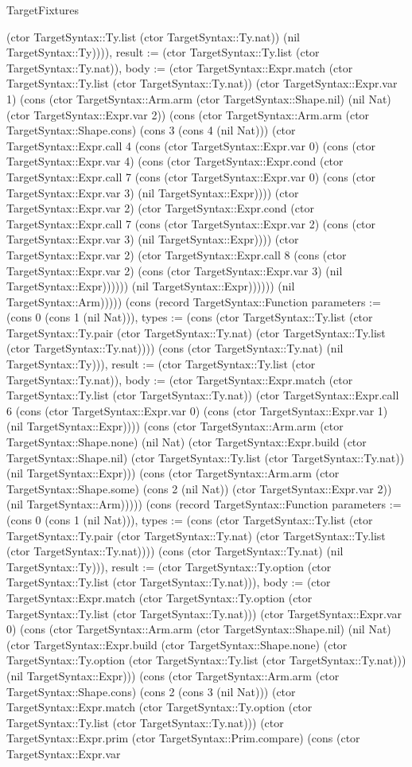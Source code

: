 \begin{lexlean}{TargetFixtures}
\begin{semanticmodule}
{(ctor TargetSyntax::Ty.list (ctor TargetSyntax::Ty.nat)) (nil TargetSyntax::Ty)))), result := (ctor TargetSyntax::Ty.list (ctor TargetSyntax::Ty.nat)), body := (ctor TargetSyntax::Expr.match (ctor TargetSyntax::Ty.list (ctor TargetSyntax::Ty.nat)) (ctor TargetSyntax::Expr.var 1) (cons (ctor TargetSyntax::Arm.arm (ctor TargetSyntax::Shape.nil) (nil Nat) (ctor TargetSyntax::Expr.var 2)) (cons (ctor TargetSyntax::Arm.arm (ctor TargetSyntax::Shape.cons) (cons 3 (cons 4 (nil Nat))) (ctor TargetSyntax::Expr.call 4 (cons (ctor TargetSyntax::Expr.var 0) (cons (ctor TargetSyntax::Expr.var 4) (cons (ctor TargetSyntax::Expr.cond (ctor TargetSyntax::Expr.call 7 (cons (ctor TargetSyntax::Expr.var 0) (cons (ctor TargetSyntax::Expr.var 3) (nil TargetSyntax::Expr)))) (ctor TargetSyntax::Expr.var 2) (ctor TargetSyntax::Expr.cond (ctor TargetSyntax::Expr.call 7 (cons (ctor TargetSyntax::Expr.var 2) (cons (ctor TargetSyntax::Expr.var 3) (nil TargetSyntax::Expr)))) (ctor TargetSyntax::Expr.var 2) (ctor TargetSyntax::Expr.call 8 (cons (ctor TargetSyntax::Expr.var 2) (cons (ctor TargetSyntax::Expr.var 3) (nil TargetSyntax::Expr)))))) (nil TargetSyntax::Expr)))))) (nil TargetSyntax::Arm))))}) (cons (record TargetSyntax::Function {parameters := (cons 0 (cons 1 (nil Nat))), types := (cons (ctor TargetSyntax::Ty.list (ctor TargetSyntax::Ty.pair (ctor TargetSyntax::Ty.nat) (ctor TargetSyntax::Ty.list (ctor TargetSyntax::Ty.nat)))) (cons (ctor TargetSyntax::Ty.nat) (nil TargetSyntax::Ty))), result := (ctor TargetSyntax::Ty.list (ctor TargetSyntax::Ty.nat)), body := (ctor TargetSyntax::Expr.match (ctor TargetSyntax::Ty.list (ctor TargetSyntax::Ty.nat)) (ctor TargetSyntax::Expr.call 6 (cons (ctor TargetSyntax::Expr.var 0) (cons (ctor TargetSyntax::Expr.var 1) (nil TargetSyntax::Expr)))) (cons (ctor TargetSyntax::Arm.arm (ctor TargetSyntax::Shape.none) (nil Nat) (ctor TargetSyntax::Expr.build (ctor TargetSyntax::Shape.nil) (ctor TargetSyntax::Ty.list (ctor TargetSyntax::Ty.nat)) (nil TargetSyntax::Expr))) (cons (ctor TargetSyntax::Arm.arm (ctor TargetSyntax::Shape.some) (cons 2 (nil Nat)) (ctor TargetSyntax::Expr.var 2)) (nil TargetSyntax::Arm))))}) (cons (record TargetSyntax::Function {parameters := (cons 0 (cons 1 (nil Nat))), types := (cons (ctor TargetSyntax::Ty.list (ctor TargetSyntax::Ty.pair (ctor TargetSyntax::Ty.nat) (ctor TargetSyntax::Ty.list (ctor TargetSyntax::Ty.nat)))) (cons (ctor TargetSyntax::Ty.nat) (nil TargetSyntax::Ty))), result := (ctor TargetSyntax::Ty.option (ctor TargetSyntax::Ty.list (ctor TargetSyntax::Ty.nat))), body := (ctor TargetSyntax::Expr.match (ctor TargetSyntax::Ty.option (ctor TargetSyntax::Ty.list (ctor TargetSyntax::Ty.nat))) (ctor TargetSyntax::Expr.var 0) (cons (ctor TargetSyntax::Arm.arm (ctor TargetSyntax::Shape.nil) (nil Nat) (ctor TargetSyntax::Expr.build (ctor TargetSyntax::Shape.none) (ctor TargetSyntax::Ty.option (ctor TargetSyntax::Ty.list (ctor TargetSyntax::Ty.nat))) (nil TargetSyntax::Expr))) (cons (ctor TargetSyntax::Arm.arm (ctor TargetSyntax::Shape.cons) (cons 2 (cons 3 (nil Nat))) (ctor TargetSyntax::Expr.match (ctor TargetSyntax::Ty.option (ctor TargetSyntax::Ty.list (ctor TargetSyntax::Ty.nat))) (ctor TargetSyntax::Expr.prim (ctor TargetSyntax::Prim.compare) (cons (ctor TargetSyntax::Expr.var }
\end{semanticmodule}
\end{lexlean}
